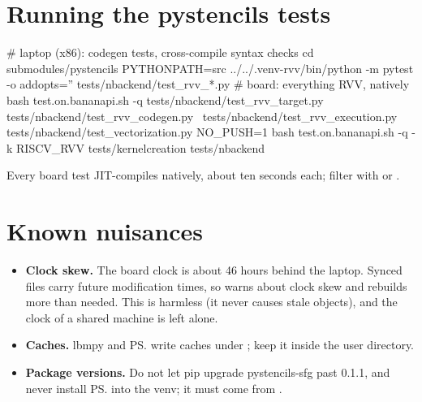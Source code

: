 \section{Running the pystencils tests}\label{r02:sec:run-tests}

\begin{shcode}
# laptop (x86): codegen tests, cross-compile syntax checks
cd submodules/pystencils
PYTHONPATH=src ../../.venv-rvv/bin/python -m pytest -o addopts='' tests/nbackend/test_rvv_*.py
# board: everything RVV, natively
bash test.on.bananapi.sh -q tests/nbackend/test_rvv_target.py tests/nbackend/test_rvv_codegen.py \
                            tests/nbackend/test_rvv_execution.py tests/nbackend/test_vectorization.py
NO_PUSH=1 bash test.on.bananapi.sh -q -k RISCV_RVV tests/kernelcreation tests/nbackend
\end{shcode}
Every board test JIT-compiles natively, about ten seconds each; filter with  or
\code{-x}.

\section{Known nuisances}\label{r02:sec:nuisances}

\begin{itemize}
  \item \textbf{Clock skew.} The board clock is about 46 hours behind the laptop.
        Synced files carry future modification times, so \code{make} warns about clock
        skew and rebuilds more than needed. This is harmless (it never causes stale
        objects), and the clock of a shared machine is left alone.
  \item \textbf{Caches.} lbmpy and \ps{} write caches under ;
        keep it inside the user directory.
  \item \textbf{Package versions.} Do not let pip upgrade pystencils-sfg past 0.1.1, and
        never install \ps{} into the venv; it must come from \code{PYTHONPATH}.
\end{itemize}
